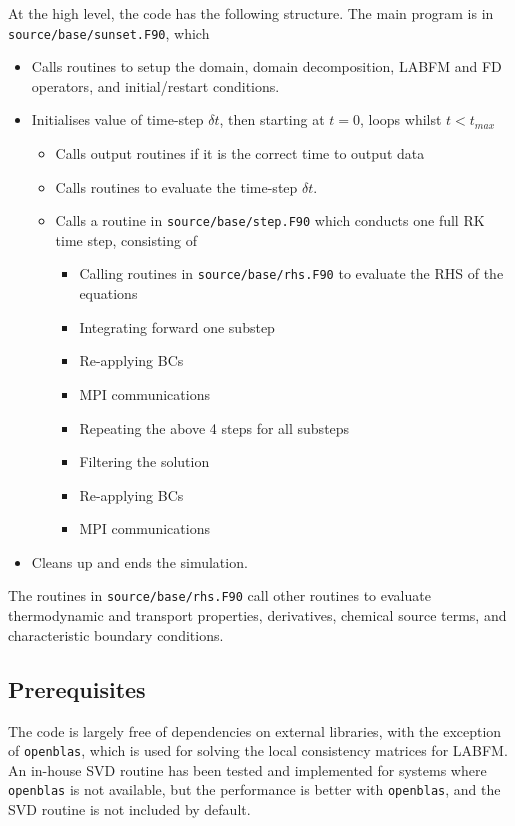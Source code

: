 \documentclass[notitlepage]{revtex4-1}
\begin{document}
At the high level, the code has the following structure. The main program is in \verb|source/base/sunset.F90|, which
\begin{itemize}
\item Calls routines to setup the domain, domain decomposition, LABFM and FD operators, and initial/restart conditions.
\item Initialises value of time-step $\delta{t}$, then starting at $t=0$, loops whilst $t<t_{max}$
\begin{itemize}
\item Calls output routines if it is the correct time to output data
\item Calls routines to evaluate the time-step $\delta{t}$.
\item Calls a routine in \verb|source/base/step.F90| which conducts one full RK time step, consisting of
\begin{itemize}
\item Calling routines in \verb|source/base/rhs.F90| to evaluate the RHS of the equations
\item Integrating forward one substep
\item Re-applying BCs
\item MPI communications
\item Repeating the above 4 steps for all substeps
\item Filtering the solution
\item Re-applying BCs
\item MPI communications
\end{itemize}
\end{itemize}
\item Cleans up and ends the simulation.
\end{itemize}

The routines in \verb|source/base/rhs.F90| call other routines to evaluate thermodynamic and transport properties, derivatives, chemical source terms, and characteristic boundary conditions.

\subsection{Prerequisites}

The code is largely free of dependencies on external libraries, with the exception of \verb|openblas|, which is used for solving the local consistency matrices for LABFM. An in-house SVD routine has been tested and implemented for systems where \verb|openblas| is not available, but the performance is better with \verb|openblas|, and the SVD routine is not included by default.
\end{document}
